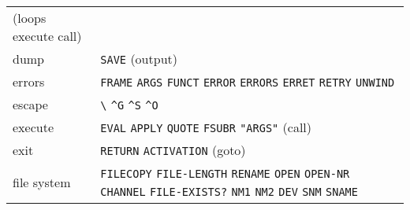 \documentclass[a4paper,]{article}
\begin{document}
\begin{longtable}[]{@{}ll@{}}
\begin{minipage}[t]{0.83\columnwidth}
(loops execute call)\strut
\end{minipage}\tabularnewline
\begin{minipage}[t]{0.11\columnwidth}\raggedright\strut
dump\strut
\end{minipage} & \begin{minipage}[t]{0.83\columnwidth}\raggedright\strut
\texttt{SAVE} (output)\strut
\end{minipage}\tabularnewline
\begin{minipage}[t]{0.11\columnwidth}\raggedright\strut
errors\strut
\end{minipage} & \begin{minipage}[t]{0.83\columnwidth}\raggedright\strut
\texttt{FRAME} \texttt{ARGS} \texttt{FUNCT} \texttt{ERROR} \texttt{ERRORS} \texttt{ERRET} \texttt{RETRY}
\texttt{UNWIND}\strut
\end{minipage}\tabularnewline
\begin{minipage}[t]{0.11\columnwidth}\raggedright\strut
escape\strut
\end{minipage} & \begin{minipage}[t]{0.83\columnwidth}\raggedright\strut
\texttt{\textbackslash{}} \texttt{\^{}G} \texttt{\^{}S} \texttt{\^{}O}\strut
\end{minipage}\tabularnewline
\begin{minipage}[t]{0.11\columnwidth}\raggedright\strut
execute\strut
\end{minipage} & \begin{minipage}[t]{0.83\columnwidth}\raggedright\strut
\texttt{EVAL} \texttt{APPLY} \texttt{QUOTE} \texttt{FSUBR} \texttt{"ARGS"} (call)\strut
\end{minipage}\tabularnewline
\begin{minipage}[t]{0.11\columnwidth}\raggedright\strut
exit\strut
\end{minipage} & \begin{minipage}[t]{0.83\columnwidth}\raggedright\strut
\texttt{RETURN} \texttt{ACTIVATION} (goto)\strut
\end{minipage}\tabularnewline
\begin{minipage}[t]{0.11\columnwidth}\raggedright\strut
file system\strut
\end{minipage} & \begin{minipage}[t]{0.83\columnwidth}\raggedright\strut
\texttt{FILECOPY} \texttt{FILE-LENGTH} \texttt{RENAME} \texttt{OPEN} \texttt{OPEN-NR} \texttt{CHANNEL}
\texttt{FILE-EXISTS?} \texttt{NM1} \texttt{NM2} \texttt{DEV} \texttt{SNM} \texttt{SNAME}\strut
\end{minipage}\tabularnewline

\end{longtable}
\end{document}
